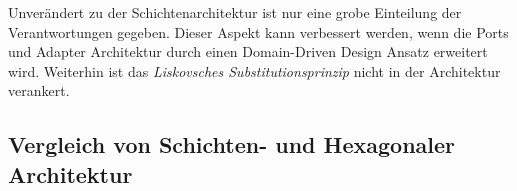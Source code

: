 \documentclass[conference]{IEEEtran}
\begin{document}
Unverändert zu der Schichtenarchitektur ist nur eine grobe Einteilung der Verantwortungen gegeben. Dieser Aspekt kann verbessert werden, wenn die Ports und Adapter Architektur durch einen Domain-Driven Design Ansatz erweitert wird. Weiterhin ist das \emph{Liskovsches Substitutionsprinzip} nicht in der Architektur verankert.

\subsection{Vergleich von Schichten- und Hexagonaler Architektur}


\printbibliography
\end{document}
